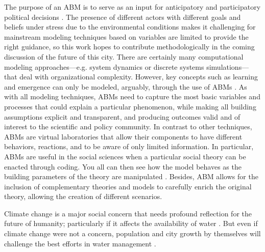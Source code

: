 \documentclass[doc,12pt,floatsintext]{apa7}
\begin{document}
The purpose of an ABM is to serve as an input for  anticipatory and participatory political decisions \parencite{daquino_role_2002}. The presence of different actors with different goals and beliefs under stress due to the environmental conditions makes it challenging for mainstream modeling techniques based on variables are limited to provide the right guidance, so this work hopes to contribute methodologically in the coming discussion of the future of this city. There are certainly many computational modeling approaches---e.g. system dynamics or discrete systems simulations---that deal with organizational complexity. However, key concepts such as learning and emergence can only be modeled, arguably, through the use of ABMs \parencite{cioffi-revilla_introduction_2014,miller_complex_2007,gilbert_simulation_2005,epstein_growing_1996}. As with all modeling techniques, ABMs need to capture the most basic variables and processes that could explain a particular phenomenon, while making all building assumptions explicit and transparent, and producing outcomes valid and of interest to the scientific and policy community. In contrast to other techniques, ABMs are virtual laboratories that allow their components to have different behaviors, reactions, and to be aware of only limited information. In particular, ABMs are useful in the social sciences when a particular social theory can be enacted through coding. You all can then see how the model behaves as the building parameters of the theory are manipulated \parencite{miller_complex_2007,epstein_growing_1996}. Besides, ABM allows for the inclusion of complementary theories and models to carefully enrich the original theory, allowing the creation of different scenarios.

   

Climate change is a major social concern that needs profound reflection for the future of humanity; particularly if it affects the availability of water \parencite{robinson_water_2023}. But even if climate change were not a concern,  population and city growth by themselves will challenge the best efforts in water management \parencite{alfarra_nbs_2018}. 

\end{document}
